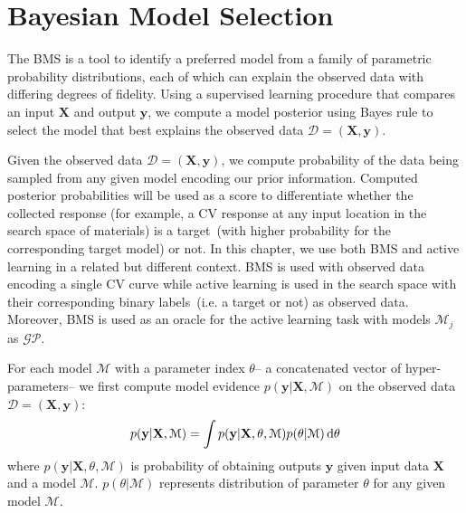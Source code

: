 \section{Bayesian Model Selection}
The BMS is a tool to identify a preferred model from a family of parametric probability distributions, each of which can explain the observed data with differing degrees of fidelity. 
Using a supervised learning procedure that compares an input \(\textbf{X}\) and output \(\textbf{y}\), we compute a model posterior using Bayes rule to select the model that best explains the observed data \(\mathcal{D}=(\textbf{X},\textbf{y})\). 

Given the observed data \(\mathcal{D}=(\textbf{X}, \textbf{y})\), we compute probability of the data being sampled from any given model encoding our prior information.
Computed posterior probabilities will be used as a score to differentiate whether the collected response (for example, a CV response at any input location in the search space of materials) is a target~(with higher probability for the corresponding target model) or not. 
In this chapter, we use both BMS and active learning in a related but different context. 
BMS is used with observed data encoding a single CV curve while active learning is used in the search space with their corresponding binary labels~(i.e. a target or not) as observed data. 
Moreover, BMS is used as an oracle for the active learning task with models \(\mathcal{M}_j\) as \(\mathcal{GP}\).

For each model \(\mathcal{M}\) with a parameter index \(\theta\)-- a concatenated vector of hyper-parameters-- we first compute model evidence \(p(\textbf{y}\vert \textbf{X},\mathcal{M})\) on the observed data \(\mathcal{D}=(\textbf{X}, \textbf{y})\):
\begin{equation}
    p(\textbf{y}\vert \textbf{X},\mathcal{M}) = \int p(\textbf{y}\vert \textbf{X},\theta,\mathcal{M})p(\theta\vert \mathcal{M}) \mathop{}\!\mathrm{d} \theta
\label{eq:evidM}
\end{equation}
where \(p(\textbf{y}\vert \textbf{X},\theta,\mathcal{M})\) is probability of obtaining outputs \(\textbf{y}\) given input data \(\textbf{X}\) and a model \(\mathcal{M}\). \(p(\theta\vert \mathcal{M})\) represents distribution of parameter \(\theta\) for any given model \(\mathcal{M}\).

